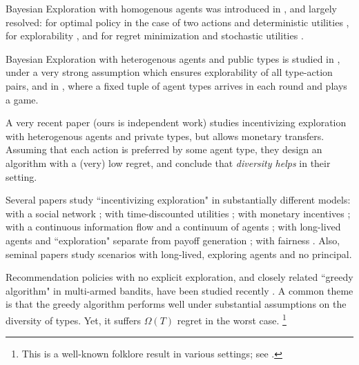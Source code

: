 
Bayesian Exploration with homogenous agents was introduced in \cite{Kremer-JPE14}, and largely resolved: for optimal policy in the case of two actions and deterministic utilities \cite{Kremer-JPE14}, for explorability \cite{ICexplorationGames-ec16}, and for regret minimization and stochastic utilities \cite{ICexploration-ec15}.

Bayesian Exploration with heterogenous agents and public types is studied in \cite{ICexploration-ec15}, under a very strong assumption which ensures explorability of all type-action pairs, and in \cite{ICexplorationGames-ec16}, where a fixed tuple of agent types arrives in each round and plays a game. 

A very recent paper \cite{Kempe-colt18} (ours is independent work) studies incentivizing exploration with heterogenous agents and private types, but allows monetary transfers. Assuming that each action is preferred by some agent type, they design an algorithm with a (very) low regret, and conclude that \emph{diversity helps} in their setting.

Several papers study ``incentivizing exploration" in substantially different models:
with a social network \cite{Bahar-ec16};
with time-discounted utilities \cite{Bimpikis-exploration-ms17};
with monetary incentives \cite{Frazier-ec14,Kempe-colt18};
with a continuous information flow and a continuum of agents \cite{Che-13};
with long-lived agents and ``exploration" separate from payoff generation \cite{Bobby-Glen-ec16,Annie-ec18-traps,Liang-ec18};
with fairness \cite{KKMPRVW17}. Also, seminal papers \cite{Bolton-econometrica99,Keller-econometrica05} study scenarios with
long-lived, exploring agents and no principal.

Recommendation policies with no explicit exploration, and closely related ``greedy algorithm" in multi-armed bandits, have been studied recently \cite{bastani2017exploiting,Sven-aistats18,kannan2018smoothed,externalities-colt18}.
A common theme is that the greedy algorithm performs well under  substantial assumptions on the diversity of types. Yet, it suffers $\Omega(T)$ regret in the worst case.%
\footnote{This is a well-known folklore result in various settings; \eg see \cite{CompetingBandits-itcs18,Sven-aistats18}.}


